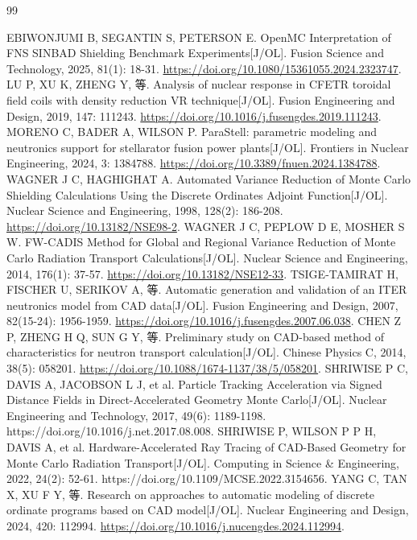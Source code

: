 \documentclass[UTF8, zihao=-4, fontset=none, a4paper]{ctexart}
\begin{document}
\clearpage
{}
{}
\begin{thebibliography}{99}
\setlength{\itemsep}{3pt}
\raggedright
\small
{} EBIWONJUMI B, SEGANTIN S, PETERSON E. OpenMC Interpretation of FNS SINBAD Shielding Benchmark Experiments{[}J/OL{]}. Fusion Science and Technology, 2025, 81(1): 18-31. \url{https://doi.org/10.1080/15361055.2024.2323747}.
 LU P, XU K, ZHENG Y, 等. Analysis of nuclear response in CFETR toroidal field coils with density reduction VR technique{[}J/OL{]}. Fusion Engineering and Design, 2019, 147: 111243. \url{https://doi.org/10.1016/j.fusengdes.2019.111243}.
 MORENO C, BADER A, WILSON P. ParaStell: parametric modeling and neutronics support for stellarator fusion power plants{[}J/OL{]}. Frontiers in Nuclear Engineering, 2024, 3: 1384788. \url{https://doi.org/10.3389/fnuen.2024.1384788}.
 WAGNER J C, HAGHIGHAT A. Automated Variance Reduction of Monte Carlo Shielding Calculations Using the Discrete Ordinates Adjoint Function{[}J/OL{]}. Nuclear Science and Engineering, 1998, 128(2): 186-208. \url{https://doi.org/10.13182/NSE98-2}.
 WAGNER J C, PEPLOW D E, MOSHER S W. FW-CADIS Method for Global and Regional Variance Reduction of Monte Carlo Radiation Transport Calculations{[}J/OL{]}. Nuclear Science and Engineering, 2014, 176(1): 37-57. \url{https://doi.org/10.13182/NSE12-33}.
 TSIGE-TAMIRAT H, FISCHER U, SERIKOV A, 等. Automatic generation and validation of an ITER neutronics model from CAD data{[}J/OL{]}. Fusion Engineering and Design, 2007, 82(15-24): 1956-1959. \url{https://doi.org/10.1016/j.fusengdes.2007.06.038}.
 CHEN Z P, ZHENG H Q, SUN G Y, 等. Preliminary study on CAD-based method of characteristics for neutron transport calculation{[}J/OL{]}. Chinese Physics C, 2014, 38(5): 058201. \url{https://doi.org/10.1088/1674-1137/38/5/058201}.
 SHRIWISE P C, DAVIS A, JACOBSON L J, et al. Particle Tracking Acceleration via Signed Distance Fields in Direct-Accelerated Geometry Monte Carlo{[}J/OL{]}. Nuclear Engineering and Technology, 2017, 49(6): 1189-1198. https://doi.org/10.1016/j.net.2017.08.008.
 SHRIWISE P, WILSON P P H, DAVIS A, et al. Hardware-Accelerated Ray Tracing of CAD-Based Geometry for Monte Carlo Radiation Transport{[}J/OL{]}. Computing in Science \& Engineering, 2022, 24(2): 52-61. https://doi.org/10.1109/MCSE.2022.3154656.
 YANG C, TAN X, XU F Y, 等. Research on approaches to automatic modeling of discrete ordinate programs based on CAD model{[}J/OL{]}. Nuclear Engineering and Design, 2024, 420: 112994. \url{https://doi.org/10.1016/j.nucengdes.2024.112994}.

\end{thebibliography}
\end{document}
